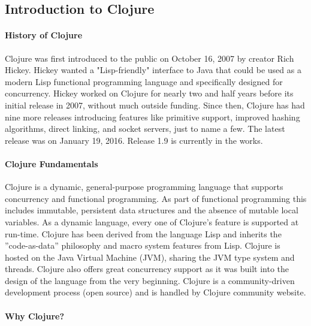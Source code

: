 \clojureColor
\subsection{Introduction to Clojure}

\paragraph{History of Clojure}
    
    Clojure was first introduced to the public on October 16, 2007 by creator Rich Hickey. Hickey wanted a "Lisp-friendly" interface to Java that could be used as a modern Lisp functional programming language and specifically designed for concurrency. Hickey worked on Clojure for nearly two and half years before its initial release in 2007, without much outside funding. Since then, Clojure has had nine more releases introducing features like primitive support, improved hashing algorithms, direct linking, and socket servers, just to name a few. The latest release was on January 19, 2016. Release 1.9 is currently in the works.
    \cite{ClojureHistory_GitHub_Website}
    
    
\paragraph{Clojure Fundamentals}
    
    Clojure is a dynamic, general-purpose programming language that supports concurrency and functional programming. As part of functional programming this includes immutable, persistent data structures and the absence of mutable local variables. As a dynamic language, every one of Clojure's feature is supported at run-time. Clojure has been derived from the language Lisp and inherits the ''code-as-data'' philosophy and macro system features from Lisp. Clojure is hosted on the Java Virtual Machine (JVM), sharing the JVM type system and threads. Clojure also offers great concurrency support as it was built into the design of the language from the very beginning. Clojure is a community-driven development process (open source) and is handled by Clojure community website.  
    \cite{ClojureConcurrencySupport_Slides_Hickey}
    
\paragraph{Why Clojure?}
   
